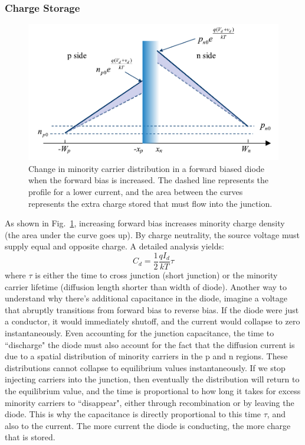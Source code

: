 \subsubsection*{Charge Storage} \label{sec:charge_storage}
\begin{figure}[tb]
\centering
\includegraphics[width=.75\columnwidth]{slide47}
\caption{Change in minority carrier distribution in a forward biased diode when the forward bias is increased.  The dashed line represents the profile for a lower current, and the area between the curves represents the extra charge stored that must flow into the junction.}
\label{fig:slide47}
\end{figure}
As shown in Fig.~\ref{fig:slide47}, increasing forward bias increases minority charge density (the area under the curve goes up).   By charge neutrality, the source voltage must supply equal and opposite charge. %
A detailed analysis yields:
    \begin{equation}
        {C_d} = \frac{1}{2}\frac{{q{I_d}}}{{kT}}\tau
    \end{equation}
where  $\tau$ is either the time to cross junction (short junction) or the minority carrier lifetime (diffusion length shorter than width of diode).  
Another way to understand why there's additional capacitance in the diode, imagine a voltage that abruptly transitions from forward bias to reverse bias.  If the diode were just a conductor, it would immediately shutoff, and the current would collapse to zero instantaneously.  Even accounting for the junction capacitance, the time to ``discharge" the diode must also account for the fact that the diffusion current is due to a spatial distribution of minority carriers in the p and n regions.  These distributions cannot collapse to equilibrium values instantaneously.  If we stop injecting carriers into the junction, then eventually the distribution will return to the equilibrium value, and the time is proportional to how long it takes for excess minority carriers to ``disappear", either through recombination or by leaving the diode.  This is why the capacitance is directly proportional to this time $\tau$, and also to the current.  The more current the diode is conducting, the more charge that is stored.  
